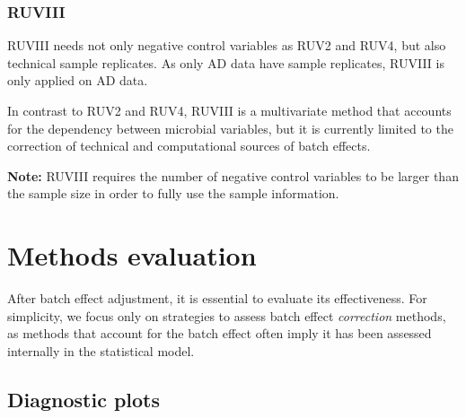 \documentclass[]{book}
\newenvironment{Shaded}{\begin{snugshade}}{\end{snugshade}}
\newcommand{\KeywordTok}[1]{\textcolor[rgb]{0.13,0.29,0.53}{\textbf{#1}}}
\newcommand{\DataTypeTok}[1]{\textcolor[rgb]{0.13,0.29,0.53}{#1}}
\newcommand{\StringTok}[1]{\textcolor[rgb]{0.31,0.60,0.02}{#1}}
\newcommand{\CommentTok}[1]{\textcolor[rgb]{0.56,0.35,0.01}{\textit{#1}}}
\newcommand{\OperatorTok}[1]{\textcolor[rgb]{0.81,0.36,0.00}{\textbf{#1}}}
\newcommand{\NormalTok}[1]{#1}
\begin{document}
\subsection{RUVIII}\label{ruviii}

RUVIII needs not only negative control variables as RUV2 and RUV4, but
also technical sample replicates. As only AD data have sample
replicates, RUVIII is only applied on AD data.

In contrast to RUV2 and RUV4, RUVIII is a multivariate method that
accounts for the dependency between microbial variables, but it is
currently limited to the correction of technical and computational
sources of batch effects.

\textbf{Note:} RUVIII requires the number of negative control variables
to be larger than the sample size in order to fully use the sample
information.

\begin{Shaded}
\end{Shaded}

\chapter{Methods evaluation}\label{eval}

After batch effect adjustment, it is essential to evaluate its
effectiveness. For simplicity, we focus only on strategies to assess
batch effect \emph{correction} methods, as methods that account for the
batch effect often imply it has been assessed internally in the
statistical model.

\section{Diagnostic plots}\label{diagnostic-plots}
\end{document}
